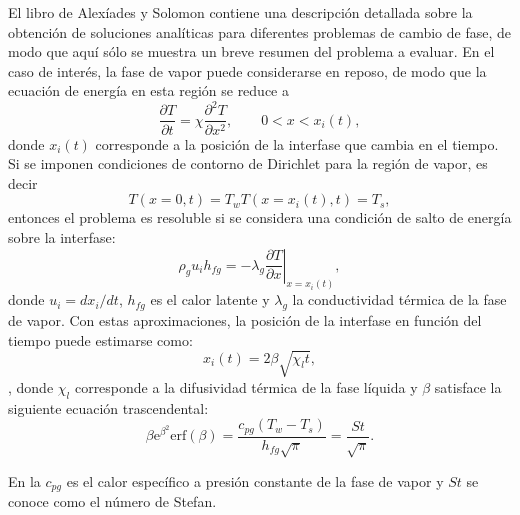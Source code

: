El libro de Alex\'iades y Solomon \cite{alexiades_mathematical_1993} contiene una descripci\'on detallada sobre la obtenci\'on de soluciones anal\'iticas para diferentes problemas de cambio de fase, de modo que aqu\'i s\'olo se muestra un breve resumen del problema a evaluar. En el caso de inter\'es, la fase de vapor puede considerarse en reposo, de modo que la ecuaci\'on de energ\'ia en esta regi\'on se reduce a 
\begin{equation}
	\dfrac{\partial T}{\partial t} = \chi \dfrac{\partial^2 T}{\partial x^2}, \qquad 0 < x < x_i(t),
\end{equation}
donde $x_i(t)$ corresponde a la posici\'on de la interfase que cambia en el tiempo. Si se imponen condiciones de contorno de Dirichlet para la regi\'on de vapor, es decir
\begin{subequations}
	\begin{equation}
		T(x=0,t) = T_w
	\end{equation}
	\begin{equation}
		T(x=x_i(t),t) = T_s,
	\end{equation}	
\end{subequations}
entonces el problema es resoluble si se considera una condici\'on de salto de energ\'ia sobre la interfase:
\begin{equation}
	\rho_g u_i h_{fg} = -\lambda_g \left.\dfrac{\partial T}{\partial x} \right|_{x=x_i(t)},
\end{equation}
donde $u_i=dx_i/dt$, $h_{fg}$ es el calor latente y $\lambda_g$ la conductividad t\'ermica de la fase de vapor. Con estas aproximaciones, la posici\'on de la interfase en funci\'on del tiempo puede estimarse como:
\begin{equation}
	x_i(t)=2\beta \sqrt{\chi_lt},
	\label{eq:stefan_int}
\end{equation},
donde $\chi_l$ corresponde a la difusividad t\'ermica de la fase l\'iquida y $\beta$ satisface la siguiente ecuaci\'on trascendental:
\begin{equation}
	\beta \mbox{e}^{\beta^2}\mbox{erf}(\beta)=\dfrac{c_{pg}(T_w-T_s)}{h_{fg}\sqrt{\pi}} = \dfrac{St}{\sqrt{\pi}}.
	\label{eq:stefan_beta}
\end{equation}

En la  $c_{pg}$ es el calor espec\'ifico a presi\'on constante de la fase de vapor y $St$ se conoce como el n\'umero de Stefan. 

